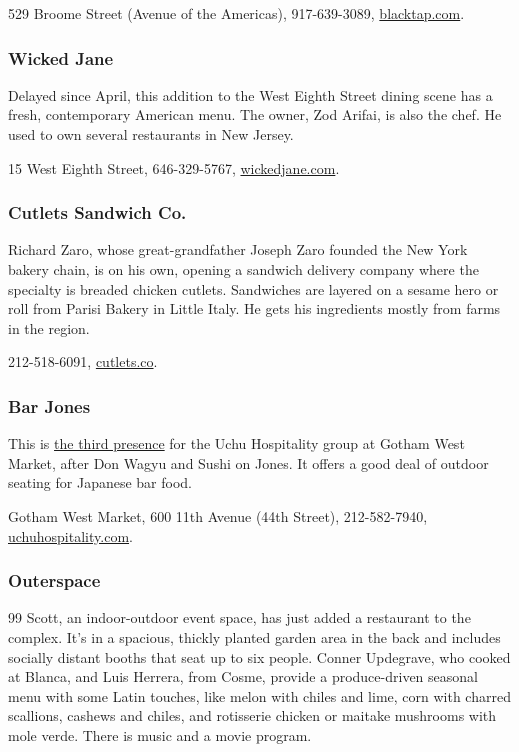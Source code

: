 529 Broome Street (Avenue of the Americas), 917-639-3089,
\href{https://blacktap.com/}{blacktap.com}.

\hypertarget{wicked-jane-}{%
\subsubsection{Wicked Jane }\label{wicked-jane-}}

Delayed since April, this addition to the West Eighth Street dining
scene has a fresh, contemporary American menu. The owner, Zod Arifai, is
also the chef. He used to own several restaurants in New Jersey.

15 West Eighth Street, 646-329-5767,
\href{https://www.wickedjane.com/}{wickedjane.com}.

\hypertarget{cutlets-sandwich-co}{%
\subsubsection{Cutlets Sandwich Co.}\label{cutlets-sandwich-co}}

Richard Zaro, whose great-grandfather Joseph Zaro founded the New York
bakery chain, is on his own, opening a sandwich delivery company where
the specialty is breaded chicken cutlets. Sandwiches are layered on a
sesame hero or roll from Parisi Bakery in Little Italy. He gets his
ingredients mostly from farms in the region.

212-518-6091, \href{http://cutlets.co/}{cutlets.co}.

\hypertarget{bar-jones-}{%
\subsubsection{Bar Jones }\label{bar-jones-}}

This is
\href{https://gothamwestmarket.com/vendor/bar-jones-by-sushi-on-jones/}{the
third presence} for the Uchu Hospitality group at Gotham West Market,
after Don Wagyu and Sushi on Jones. It offers a good deal of outdoor
seating for Japanese bar food.

Gotham West Market, 600 11th Avenue (44th Street), 212-582-7940,
\href{https://uchuhospitality.com}{uchuhospitality.com}.

\hypertarget{outerspace}{%
\subsubsection{Outerspace}\label{outerspace}}

99 Scott, an indoor-outdoor event space, has just added a restaurant to
the complex. It's in a spacious, thickly planted garden area in the back
and includes socially distant booths that seat up to six people. Conner
Updegrave, who cooked at Blanca, and Luis Herrera, from Cosme, provide a
produce-driven seasonal menu with some Latin touches, like melon with
chiles and lime, corn with charred scallions, cashews and chiles, and
rotisserie chicken or maitake mushrooms with mole verde. There is music
and a movie program.

